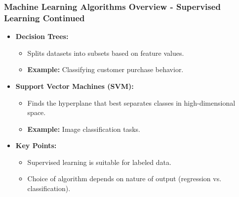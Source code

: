 \documentclass[aspectratio=169]{beamer}
\begin{document}
\begin{frame}[fragile]
    \frametitle{Machine Learning Algorithms Overview - Supervised Learning Continued}
    \begin{itemize}
        \item \textbf{Decision Trees:}
        \begin{itemize}
            \item Splits datasets into subsets based on feature values.
            \item \textbf{Example:} Classifying customer purchase behavior.
        \end{itemize}
        \item \textbf{Support Vector Machines (SVM):}
        \begin{itemize}
            \item Finds the hyperplane that best separates classes in high-dimensional space.
            \item \textbf{Example:} Image classification tasks.
        \end{itemize}
        \item \textbf{Key Points:}
        \begin{itemize}
            \item Supervised learning is suitable for labeled data.
            \item Choice of algorithm depends on nature of output (regression vs. classification).
        \end{itemize}
    \end{itemize}
\end{frame}
\end{document}
